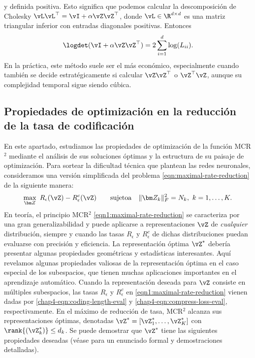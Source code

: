 \documentclass[../../book-main.tex]{subfiles}
\begin{document}
\begin{remark}
\begin{itemize}
            y definida positiva. Esto significa que podemos calcular la descomposición de Cholesky
            \(\vL\vL^{\top} = \vI + \alpha
            \vZ\vZ^{\top}\), donde \(\vL \in \R^{d \times d}\) es una
            matriz triangular inferior con entradas diagonales positivas. Entonces
            \begin{equation}
                \logdet(\vI + \alpha \vZ\vZ^{\top}) = 2\sum_{i =
                1}^{d}\log(L_{ii}).
            \end{equation}
            En la práctica, este método suele ser el más económico,
            especialmente cuando también se decide estratégicamente si
            calcular \(\vZ\vZ^{\top}\) o \(\vZ^{\top}\vZ\), aunque
            su complejidad temporal sigue siendo cúbica.
    \end{itemize}
\end{remark}

\vspace{-0.1in}

\subsection{Propiedades de optimización en la reducción de la tasa de codificación}
\label{sec:MCR-landscape}

En este apartado, estudiamos las propiedades de optimización de la
función MCR$^2$ mediante el análisis de sus soluciones óptimas y la estructura
de su paisaje de optimización. Para sortear la dificultad técnica
que plantean las redes neuronales, consideramos una versión simplificada
del problema \eqref{eqn:maximal-rate-reduction} de la siguiente manera:
\begin{align}\label{eqn1:maximal-rate-reduction}
    \max_{\bm Z}\ R_{\epsilon}(\vZ) - R_{\epsilon}^c(\vZ)\qquad
    \mathrm{sujeto a}\quad \|\bm Z_k\|_F^2 = N_k,\ k =1,\dots,K.
\end{align}
En teoría, el principio MCR$^2$ \eqref{eqn1:maximal-rate-reduction}
se caracteriza por una gran generalizabilidad y puede aplicarse a
representaciones $\vZ$ de {\em cualquier} distribución, siempre y cuando las tasas
$R_\epsilon$ y $R^c_\epsilon$ de dichas distribuciones puedan
evaluarse con precisión y eficiencia. La representación óptima
$\vZ^{\ast}$  debería presentar algunas propiedades geométricas y estadísticas
interesantes. Aquí revelamos algunas propiedades valiosas de la representación óptima
en el caso especial de los subespacios, que tienen muchas
aplicaciones importantes en el aprendizaje automático. Cuando la representación deseada
para $\vZ$ consiste en múltiples subespacios, las tasas $R_\epsilon$
y $R^c_\epsilon$ en \eqref{eqn1:maximal-rate-reduction} vienen dadas
por \eqref{chap4-eqn:coding-length-eval}
y \eqref{chap4-eqn:compress-loss-eval}, respectivamente. En el máximo de
reducción de tasa, MCR$^2$ alcanza sus representaciones óptimas,
denotadas $\vZ^{\ast} = [\vZ_1^*,\dots,\vZ_K^*]$ con
$\rank{(\vZ_{k}^*)}\le d_k$. Se puede demostrar que $\vZ^{\ast}$ tiene las
siguientes propiedades deseadas (véase \cite{yu2020learning} para un
enunciado formal y demostraciones detalladas).
\end{document}
